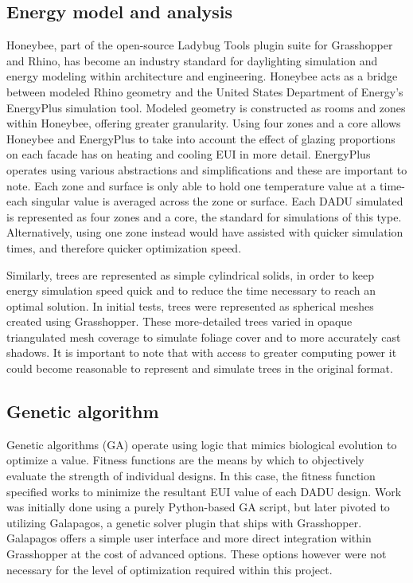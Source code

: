 \documentclass[sagev,times,Royal]{sagej}
\begin{document}
\subsection{Energy model and analysis}
Honeybee, part of the open-source Ladybug Tools plugin suite for Grasshopper and Rhino, has become an industry standard for daylighting simulation and energy modeling within architecture and engineering. Honeybee acts as a bridge between modeled Rhino geometry and the United States Department of Energy's EnergyPlus simulation tool. Modeled geometry is constructed as rooms and zones within Honeybee, offering greater granularity. Using four zones and a core allows Honeybee and EnergyPlus to take into account the effect of glazing proportions on each facade has on heating and cooling EUI in more detail. EnergyPlus operates using various abstractions and simplifications and these are important to note. Each zone and surface is only able to hold one temperature value at a time- each singular value is averaged across the zone or surface. Each DADU simulated is represented as four zones and a core, the standard for simulations of this type. Alternatively, using one zone instead would have assisted with quicker simulation times, and therefore quicker optimization speed. 
 
Similarly, trees are represented as simple cylindrical solids, in order to keep energy simulation speed quick and to reduce the time necessary to reach an optimal solution. In initial tests, trees were represented as spherical meshes created using Grasshopper. These more-detailed trees varied in opaque triangulated mesh coverage to simulate foliage cover and to more accurately cast shadows. It is important to note that with access to greater computing power it could become reasonable to represent and simulate trees in the original format.


\subsection{Genetic algorithm}
Genetic algorithms (GA) operate using logic that mimics biological evolution to optimize a value. Fitness functions are the means by which to objectively evaluate the strength of individual designs. In this case, the fitness function specified works to minimize the resultant EUI value of each DADU design. Work was initially done using a purely Python-based GA script, but later pivoted to utilizing Galapagos, a genetic solver plugin that ships with Grasshopper. Galapagos offers a simple user interface and more direct integration within Grasshopper at the cost of advanced options. These options however were not necessary for the level of optimization required within this project.
\end{document}
